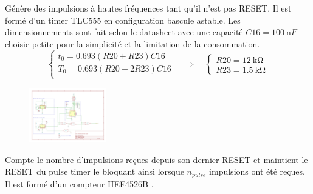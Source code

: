 \documentclass[french]{layout/Report}
\begin{document}
\begin{description}[leftmargin=!,labelwidth=3cm, labelindent=\parindent]
	\item[Pulse timer]
        Génère des impulsions à hautes fréquences tant qu'il n'est pas RESET.
        Il est formé d'un timer TLC555 en configuration bascule astable.
        Les dimensionnements sont fait selon le datasheet \cite{TLC555} avec une capacité $\mathit{C16} = \SI{100}{\nano F}$ choisie petite pour la simplicité et la limitation de la consommation.
		\begin{equation*}
			\begin{cases}
				t_0 = 0.693(\mathit{R20}+\mathit{R23})\mathit{C16} \\
				T_0 = 0.693(\mathit{R20}+2\mathit{R23})\mathit{C16} \\
			\end{cases}
			\quad\Rightarrow\quad
			\begin{cases}
				\mathit{R20} = \SI{12}{\kilo\ohm} \\
				\mathit{R23} = \SI{1.5}{\kilo\ohm}
			\end{cases}
		\end{equation*}

        \begin{figure}[H]
        \centering
        \includegraphics[width=0.3\textwidth]{fig/pulse_timer.pdf}
        \end{figure}

	\item[Down counter]
        Compte le nombre d'impulsions reçues depuis son dernier RESET et maintient le RESET du pulse timer le bloquant ainsi lorsque $n_{pulse}$ impulsions ont été reçues.
        Il est formé d'un compteur HEF4526B \cite{HEF4526B}.


\end{description}
\end{document}
